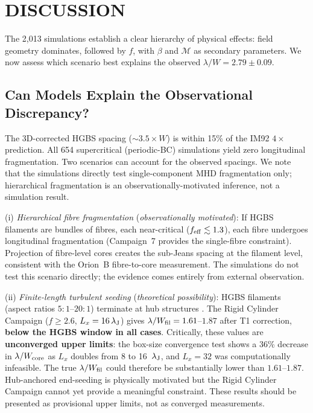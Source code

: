 \documentclass[twoside,twocolumn]{mnras}
\begin{document}
\section{DISCUSSION}
\label{sec:discussion}

The 2,013 simulations establish a clear hierarchy of physical effects: field geometry
dominates, followed by $f$, with $\beta$ and $\mathcal{M}$ as secondary parameters.
We now assess which scenario best explains the observed $\lambda/W = 2.79 \pm 0.09$.

\subsection{Can Models Explain the Observational Discrepancy?}

The 3D-corrected HGBS spacing (${\sim}3.5\times W$) is within 15\% of the IM92
$4\times$ prediction. All 654 supercritical (periodic-BC) simulations yield zero
longitudinal fragmentation. Two scenarios can account for the observed spacings. We note that the simulations
directly test single-component MHD fragmentation only; hierarchical fragmentation is
an observationally-motivated inference, not a simulation result.

(i) \textit{Hierarchical fibre fragmentation} (\textit{observationally motivated}): If HGBS filaments are bundles of fibres, each near-critical ($f_{\rm eff} \lesssim 1.3$), each fibre undergoes longitudinal fragmentation (Campaign~7 provides the single-fibre constraint). Projection of fibre-level cores creates the sub-Jeans spacing at the filament level, consistent with the \citet{Yang2024} Orion~B fibre-to-core measurement. The simulations do not test this scenario directly; the evidence comes entirely from external observation.

(ii) \textit{Finite-length turbulent seeding} (\textit{theoretical possibility}):
HGBS filaments (aspect ratios $5:1$--$20:1$) terminate at hub structures \citep{Andre2010}.
The Rigid Cylinder Campaign ($f \geq 2.6$, $L_x=16\,\lambda_{\rm J}$) gives
$\lambda/W_{\rm fil} = 1.61$--$1.87$ after T1 correction, \textbf{below the HGBS
window in all cases}. Critically, these values are \textbf{unconverged upper limits}:
the box-size convergence test shows a 36\% decrease in $\lambda/W_{\rm core}$ as
$L_x$ doubles from 8 to 16~$\lambda_{\rm J}$, and $L_x=32$ was computationally
infeasible. The true $\lambda/W_{\rm fil}$ could therefore be substantially lower than
$1.61$--$1.87$. Hub-anchored end-seeding is physically motivated but the Rigid
Cylinder Campaign cannot yet provide a meaningful constraint. These results should
be presented as provisional upper limits, not as converged measurements.
\end{document}
